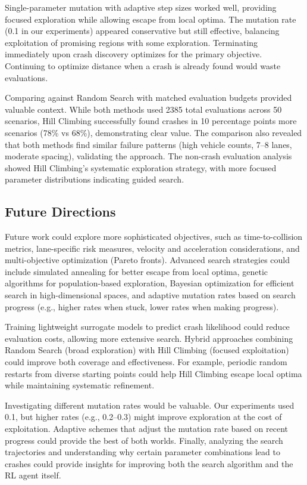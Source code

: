 \documentclass[11pt,a4paper]{article}
\begin{document}
Single-parameter mutation with adaptive step sizes worked well, providing focused exploration while allowing escape from local optima. The mutation rate (0.1 in our experiments) appeared conservative but still effective, balancing exploitation of promising regions with some exploration. Terminating immediately upon crash discovery optimizes for the primary objective. Continuing to optimize distance when a crash is already found would waste evaluations.

Comparing against Random Search with matched evaluation budgets provided valuable context. While both methods used 2385 total evaluations across 50 scenarios, Hill Climbing successfully found crashes in 10 percentage points more scenarios (78\% vs 68\%), demonstrating clear value. The comparison also revealed that both methods find similar failure patterns (high vehicle counts, 7--8 lanes, moderate spacing), validating the approach. The non-crash evaluation analysis showed Hill Climbing's systematic exploration strategy, with more focused parameter distributions indicating guided search.

\subsection{Future Directions}

Future work could explore more sophisticated objectives, such as time-to-collision metrics, lane-specific risk measures, velocity and acceleration considerations, and multi-objective optimization (Pareto fronts). Advanced search strategies could include simulated annealing for better escape from local optima, genetic algorithms for population-based exploration, Bayesian optimization for efficient search in high-dimensional spaces, and adaptive mutation rates based on search progress (e.g., higher rates when stuck, lower rates when making progress).

Training lightweight surrogate models to predict crash likelihood could reduce evaluation costs, allowing more extensive search. Hybrid approaches combining Random Search (broad exploration) with Hill Climbing (focused exploitation) could improve both coverage and effectiveness. For example, periodic random restarts from diverse starting points could help Hill Climbing escape local optima while maintaining systematic refinement.

Investigating different mutation rates would be valuable. Our experiments used 0.1, but higher rates (e.g., 0.2--0.3) might improve exploration at the cost of exploitation. Adaptive schemes that adjust the mutation rate based on recent progress could provide the best of both worlds. Finally, analyzing the search trajectories and understanding why certain parameter combinations lead to crashes could provide insights for improving both the search algorithm and the RL agent itself.
\end{document}
